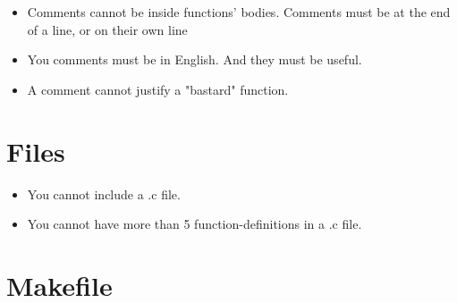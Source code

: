 \documentclass{42-en}
\begin{document}
        \begin{itemize}

            \item Comments cannot be inside functions' bodies.
                Comments must be at the end of a line, or on their own line

            \item You comments must be in English. And they must be
                useful.

            \item A comment cannot justify a "bastard" function.

        \end{itemize}
        \newpage


    \section{Files}

        \begin{itemize}

            \item You cannot include a .c file.

            \item You cannot have more than 5 function-definitions in a .c file.

        \end{itemize}
        \newpage


    \section{Makefile}
\end{document}
